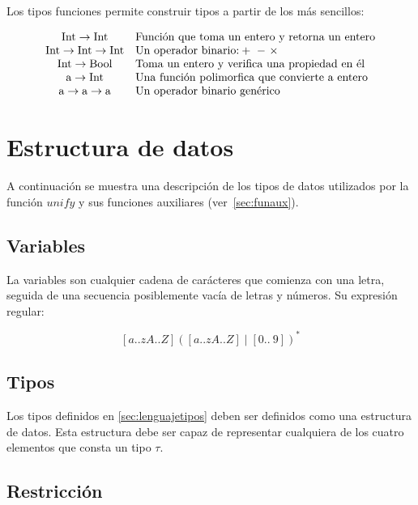 \documentclass{article}
\begin{document}
Los tipos funciones permite construir tipos a partir de los más
sencillos:

\[
  \begin{array}[h]{cl}
    \text{Int} \to \text{Int} & \text{Función que toma un entero y retorna un entero} \\
    \text{Int} \to \text{Int} \to \text{Int} & \text{Un operador binario:} +\ -\ \times\ \\
    \text{Int} \to \text{Bool} & \text{Toma un entero y verifica una propiedad en él} \\
    \text{a} \to \text{Int} & \text{Una función polimorfica que convierte a entero} \\
    \text{a} \to \text{a} \to \text{a} & \text{Un operador binario genérico} \\
  \end{array}
\]

\section{Estructura de datos}\label{sec:estructdatos}

A continuación se muestra una descripción de los tipos de datos
utilizados por la función $unify$ y sus funciones auxiliares
(ver~\ref{sec:funaux}).

\subsection{Variables}
\label{sec:var}

La variables son cualquier cadena de carácteres que comienza con una letra,
seguida de una secuencia posiblemente vacía de letras y números. Su expresión
regular:

\[
  [a..zA..Z]([a..zA..Z] \mid [0 ..\ 9])^*
\]

\subsection{Tipos}
\label{sec:estrutipos}

Los tipos definidos en \ref{sec:lenguajetipos} deben ser definidos
como una estructura de datos. Esta estructura debe ser capaz de
representar cualquiera de los cuatro elementos que consta un tipo $\tau$.

\subsection{Restricción}
\label{sec:estrurest}
\end{document}
